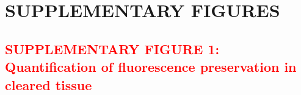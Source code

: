 \documentclass[]{spie}  %
\def\red{\textcolor{red}}
\begin{document}
\section*{SUPPLEMENTARY FIGURES}


\subsection*{\red{SUPPLEMENTARY FIGURE 1: Quantification of fluorescence preservation in cleared tissue}}
\vspace{1mm}
\end{document}
